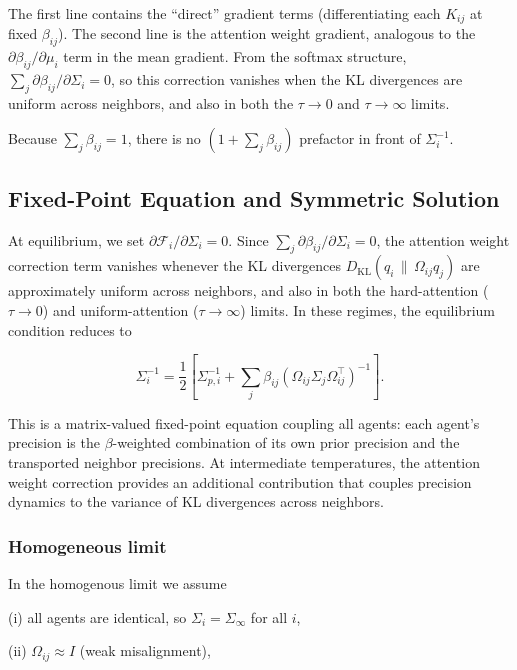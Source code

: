 \documentclass[twoside,11pt]{article}
\begin{document}
The first line contains the ``direct'' gradient terms (differentiating each $K_{ij}$ at fixed $\beta_{ij}$). The second line is the attention weight gradient, analogous to the $\partial \beta_{ij}/\partial \mu_i$ term in the mean gradient. From the softmax structure, $\sum_j \partial \beta_{ij}/\partial \Sigma_i = 0$, so this correction vanishes when the KL divergences are uniform across neighbors, and also in both the $\tau \to 0$ and $\tau \to \infty$ limits.

Because $\sum_j \beta_{ij} = 1$, there is no $(1 + \sum_j \beta_{ij})$ prefactor in front of $\Sigma_i^{-1}$.

\subsection{Fixed-Point Equation and Symmetric Solution}

At equilibrium, we set $\partial \mathcal{F}_i / \partial \Sigma_i = 0$. Since $\sum_j \partial \beta_{ij}/\partial \Sigma_i = 0$, the attention weight correction term vanishes whenever the KL divergences $D_{\mathrm{KL}}(q_i \,\|\, \Omega_{ij}q_j)$ are approximately uniform across neighbors, and also in both the hard-attention ($\tau \to 0$) and uniform-attention ($\tau \to \infty$) limits. In these regimes, the equilibrium condition reduces to

\begin{equation}
\Sigma_i^{-1}
=\frac{1}{2}
\left[
\Sigma_{p,i}^{-1}
+ \sum_j \beta_{ij}
(\Omega_{ij}\Sigma_j\Omega_{ij}^\top)^{-1}
\right].
\label{eq:sigma_fixed_point_beta}
\end{equation}

This is a matrix-valued fixed-point equation coupling all agents: each agent's precision is the $\beta$-weighted combination of its own prior precision and the transported neighbor precisions. At intermediate temperatures, the attention weight correction provides an additional contribution that couples precision dynamics to the variance of KL divergences across neighbors.

\subsubsection{Homogeneous limit}

In the homogenous limit we assume

(i) all agents are identical, so $\Sigma_i = \Sigma_\infty$ for all $i$,

(ii) $\Omega_{ij} \approx I$ (weak misalignment),
\end{document}
